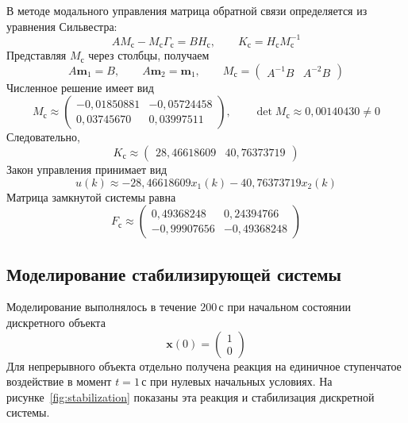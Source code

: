 В методе модального управления матрица обратной связи определяется
из уравнения Сильвестра:
\begin{equation}
  A M_{\text{с}}-M_{\text{с}}\Gamma_{\text{с}}=BH_{\text{с}},
  \qquad K_{\text{с}}=H_{\text{с}}M_{\text{с}}^{-1}
  \label{eq:stabilizing-sylvester}
\end{equation}
Представляя $M_{\text{с}}$ через столбцы, получаем
\begin{equation}
  A\bm m_1=B,
  \qquad A\bm m_2=\bm m_1,
  \qquad
  M_{\text{с}}=\begin{pmatrix}A^{-1}B&A^{-2}B\end{pmatrix}
  \label{eq:stabilizing-sylvester-columns}
\end{equation}
Численное решение имеет вид
\begin{equation}
  M_{\text{с}}\approx
  \begin{pmatrix}
    -0{,}01850881&-0{,}05724458\\
    0{,}03745670&0{,}03997511
  \end{pmatrix},
  \qquad \det M_{\text{с}}\approx0{,}00140430\ne0
  \label{eq:stabilizing-sylvester-numeric}
\end{equation}
Следовательно,
\begin{equation}
  K_{\text{с}}\approx\begin{pmatrix}28{,}46618609&40{,}76373719\end{pmatrix}
  \label{eq:stabilizing-gain}
\end{equation}
Закон управления принимает вид
\begin{equation}
  u(k)\approx-28{,}46618609x_1(k)-40{,}76373719x_2(k)
  \label{eq:stabilizing-control-numeric}
\end{equation}
Матрица замкнутой системы равна
\begin{equation}
  F_{\text{с}}\approx
  \begin{pmatrix}
    0{,}49368248&0{,}24394766\\
    -0{,}99907656&-0{,}49368248
  \end{pmatrix}
  \label{eq:stabilizing-closed-loop}
\end{equation}

\subsection{Моделирование стабилизирующей системы}

Моделирование выполнялось в течение $200\,\text{с}$ при начальном состоянии
дискретного объекта
\begin{equation}
  \bm x(0)=\begin{pmatrix}1\\0\end{pmatrix}
  \label{eq:simulation-initial-state}
\end{equation}
Для непрерывного объекта отдельно получена реакция на единичное ступенчатое
воздействие в момент $t=1\,\text{с}$ при нулевых начальных условиях.
На рисунке~\ref{fig:stabilization}
показаны эта реакция и стабилизация дискретной системы.

